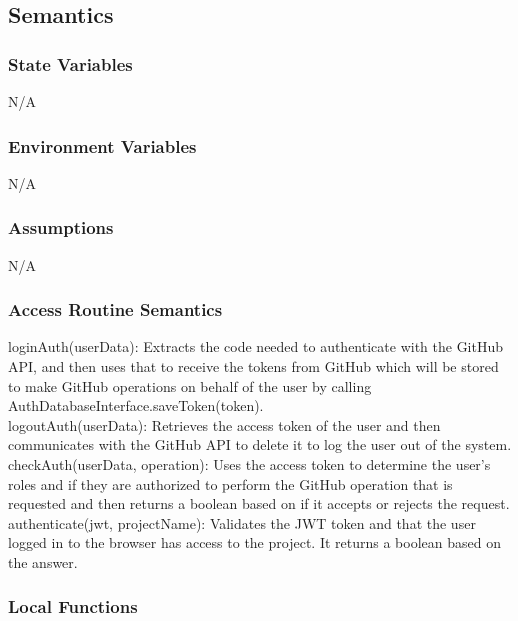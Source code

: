 \documentclass[12pt, titlepage]{article}
\begin{document}
	
	\subsection{Semantics}
	
	\subsubsection{State Variables}
	N/A
	
	\subsubsection{Environment Variables}
	N/A
	
	\subsubsection{Assumptions}
	N/A
	
	\subsubsection{Access Routine Semantics}
	
	\noindent loginAuth(userData): Extracts the code needed to authenticate with the GitHub API, and then uses that to receive the tokens from GitHub which will be stored to make GitHub operations on behalf of the user by calling AuthDatabaseInterface.saveToken(token).  \\
	
	\noindent logoutAuth(userData): Retrieves the access token of the user and then communicates with the GitHub API to delete it to log the user out of the system. \\
	
	\noindent checkAuth(userData, operation): Uses the access token to determine the user’s roles and if they are authorized to perform the GitHub operation that is requested and then returns a boolean based on if it accepts or rejects the request. \\
	
	\noindent authenticate(jwt, projectName): Validates the JWT token and that the user logged in to the browser has access to the project. It returns a boolean based on the answer. \\
	
	\subsubsection{Local Functions}
	
\end{document}
